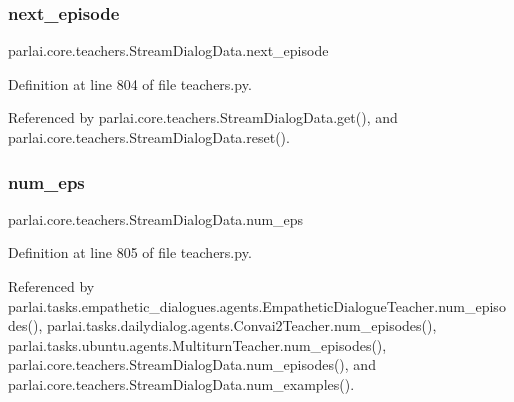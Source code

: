\mbox{\label{classparlai_1_1core_1_1teachers_1_1StreamDialogData_a40ac215e58913119b1406b1d440a55f4}} 
\subsubsection{\texorpdfstring{next\+\_\+episode}{next\_episode}}
{\footnotesize\ttfamily parlai.\+core.\+teachers.\+Stream\+Dialog\+Data.\+next\+\_\+episode}



Definition at line 804 of file teachers.\+py.



Referenced by parlai.\+core.\+teachers.\+Stream\+Dialog\+Data.\+get(), and parlai.\+core.\+teachers.\+Stream\+Dialog\+Data.\+reset().

\mbox{\label{classparlai_1_1core_1_1teachers_1_1StreamDialogData_a8f5807d28b1b0a4d7eb09ae287b2c01b}} 
\subsubsection{\texorpdfstring{num\+\_\+eps}{num\_eps}}
{\footnotesize\ttfamily parlai.\+core.\+teachers.\+Stream\+Dialog\+Data.\+num\+\_\+eps}



Definition at line 805 of file teachers.\+py.



Referenced by parlai.\+tasks.\+empathetic\+\_\+dialogues.\+agents.\+Empathetic\+Dialogue\+Teacher.\+num\+\_\+episodes(), parlai.\+tasks.\+dailydialog.\+agents.\+Convai2\+Teacher.\+num\+\_\+episodes(), parlai.\+tasks.\+ubuntu.\+agents.\+Multiturn\+Teacher.\+num\+\_\+episodes(), parlai.\+core.\+teachers.\+Stream\+Dialog\+Data.\+num\+\_\+episodes(), and parlai.\+core.\+teachers.\+Stream\+Dialog\+Data.\+num\+\_\+examples().


